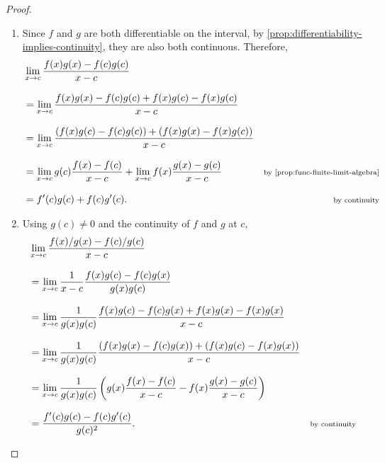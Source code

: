 \documentclass[../MathsNotesBase.tex]{subfiles}
\begin{document}
{\begin{proof}
\begin{enumerate}[label=(\roman*)]
				\bigskip
				\item Since $f$ and $g$ are both differentiable on the interval, by \autoref{prop:differentiability-implies-continuity}, they are also both continuous. Therefore,
				\[\begin{aligned}
					&\lim_{x \to c} \frac{f(x)g(x) - f(c)g(c)}{x - c} \nnn
					&= \lim_{x \to c} \frac{f(x)g(x) - f(c)g(c) + f(x)g(c) - f(x)g(c)}{x - c} \nnn
					&= \lim_{x \to c} \frac{(f(x)g(c) - f(c)g(c)) + (f(x)g(x) - f(x)g(c))}{x - c} \nnn
					&= \lim_{x \to c} g(c)\frac{f(x) - f(c)}{x - c} + \lim_{x \to c} f(x)\frac{g(x) - g(c)}{x - c} &\sidecomment{by \autoref{prop:func-finite-limit-algebra}} \nnn
					&= f'(c)g(c) + f(c)g'(c).  &\sidecomment{by continuity}
				\end{aligned}\]
				
				\bigskip
				\item Using ${ g(c) \neq 0 }$ and the continuity of $f$ and $g$ at $c$,
				\[\begin{aligned}
					&\lim_{x \to c} \frac{f(x)/g(x) - f(c)/g(c)}{x - c} \nnn
					&= \lim_{x \to c} \frac{1}{x - c} \frac{f(x)g(c) - f(c)g(x)}{g(x)g(c)} \nnn
					&= \lim_{x \to c} \frac{1}{g(x)g(c)} \frac{ f(x)g(c) - f(c)g(x) + f(x)g(x) - f(x)g(x) }{ x - c } \nnn
					&= \lim_{x \to c} \frac{1}{g(x)g(c)} \frac{ (f(x)g(x) - f(c)g(x)) + (f(x)g(c) - f(x)g(x)) }{ x - c } \nnn
					&= \lim_{x \to c} \frac{1}{g(x)g(c)} \left( g(x)\frac{ f(x) - f(c) }{ x - c } - f(x)\frac{ g(x) - g(c) }{ x - c } \right) \nnn
					&= \frac{ f'(c)g(c) - f(c)g'(c) }{ g(c)^2 }. &\sidecomment{by continuity}
				\end{aligned}\]
			\end{enumerate}
		\end{proof}
	
}
\end{document}
